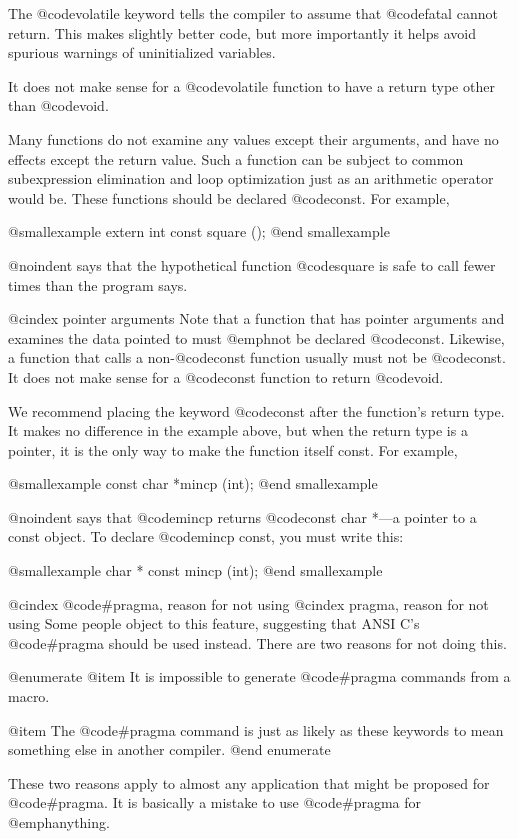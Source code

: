 {The @code{volatile} keyword tells the compiler to assume that
@code{fatal} cannot return.  This makes slightly better code, but more
importantly it helps avoid spurious warnings of uninitialized variables.

It does not make sense for a @code{volatile} function to have a return
type other than @code{void}.

Many functions do not examine any values except their arguments, and
have no effects except the return value.  Such a function can be subject
to common subexpression elimination and loop optimization just as an
arithmetic operator would be.  These functions should be declared
@code{const}.  For example,

@smallexample
extern int const square ();
@end smallexample

@noindent
says that the hypothetical function @code{square} is safe to call
fewer times than the program says.

@cindex pointer arguments
Note that a function that has pointer arguments and examines the data
pointed to must @emph{not} be declared @code{const}.  Likewise, a
function that calls a non-@code{const} function usually must not be
@code{const}.  It does not make sense for a @code{const} function to
return @code{void}.

We recommend placing the keyword @code{const} after the function's
return type.  It makes no difference in the example above, but when the
return type is a pointer, it is the only way to make the function itself
const.  For example,

@smallexample
const char *mincp (int);
@end smallexample

@noindent
says that @code{mincp} returns @code{const char *}---a pointer to a
const object.  To declare @code{mincp} const, you must write this:

@smallexample
char * const mincp (int);
@end smallexample
  
@cindex @code{#pragma}, reason for not using
@cindex pragma, reason for not using
Some people object to this feature, suggesting that ANSI C's
@code{#pragma} should be used instead.  There are two reasons for not
doing this.

@enumerate
@item
It is impossible to generate @code{#pragma} commands from a macro.

@item
The @code{#pragma} command is just as likely as these keywords to mean
something else in another compiler.
@end enumerate

These two reasons apply to almost any application that might be proposed
for @code{#pragma}.  It is basically a mistake to use @code{#pragma} for
@emph{anything}.

}
